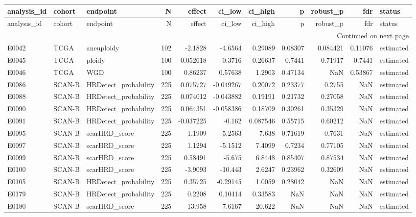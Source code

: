 \begin{longtable}{lllrrrrrrrl}
\toprule
analysis\_id & cohort & endpoint & N & effect & ci\_low & ci\_high & p & robust\_p & fdr & status \\
\midrule
\endfirsthead
\toprule
analysis\_id & cohort & endpoint & N & effect & ci\_low & ci\_high & p & robust\_p & fdr & status \\
\midrule
\endhead
\midrule
\multicolumn{11}{r}{Continued on next page} \\
\midrule
\endfoot
\bottomrule
\endlastfoot
E0042 & TCGA & aneuploidy & 102 & -2.1828 & -4.6564 & 0.29089 & 0.08307 & 0.084421 & 0.11076 & estimated \\
E0045 & TCGA & ploidy & 100 & -0.052618 & -0.3716 & 0.26637 & 0.7441 & 0.71917 & 0.7441 & estimated \\
E0046 & TCGA & WGD & 100 & 0.86237 & 0.57638 & 1.2903 & 0.47134 & NaN & 0.53867 & estimated \\
E0086 & SCAN-B & HRDetect\_probability & 225 & 0.075727 & -0.049267 & 0.20072 & 0.23377 & 0.2755 & NaN & estimated \\
E0088 & SCAN-B & HRDetect\_probability & 225 & 0.074012 & -0.043882 & 0.19191 & 0.21732 & 0.27058 & NaN & estimated \\
E0090 & SCAN-B & HRDetect\_probability & 225 & 0.064351 & -0.058386 & 0.18709 & 0.30261 & 0.35329 & NaN & estimated \\
E0091 & SCAN-B & HRDetect\_probability & 225 & -0.037225 & -0.162 & 0.087546 & 0.55715 & 0.60212 & NaN & estimated \\
E0095 & SCAN-B & scarHRD\_score & 225 & 1.1909 & -5.2563 & 7.638 & 0.71619 & 0.7631 & NaN & estimated \\
E0097 & SCAN-B & scarHRD\_score & 225 & 1.1294 & -5.1512 & 7.4099 & 0.7234 & 0.77105 & NaN & estimated \\
E0099 & SCAN-B & scarHRD\_score & 225 & 0.58491 & -5.675 & 6.8448 & 0.85407 & 0.87534 & NaN & estimated \\
E0100 & SCAN-B & scarHRD\_score & 225 & -3.9093 & -10.443 & 2.6247 & 0.23962 & 0.32609 & NaN & estimated \\
E0105 & SCAN-B & HRDetect\_probability & 225 & 0.35725 & -0.29145 & 1.0059 & 0.28042 & NaN & NaN & estimated \\
E0179 & SCAN-B & HRDetect\_probability & 225 & 0.2208 & 0.10414 & 0.33583 & NaN & NaN & NaN & estimated \\
E0180 & SCAN-B & scarHRD\_score & 225 & 13.958 & 7.6167 & 20.622 & NaN & NaN & NaN & estimated \\

\end{longtable}
